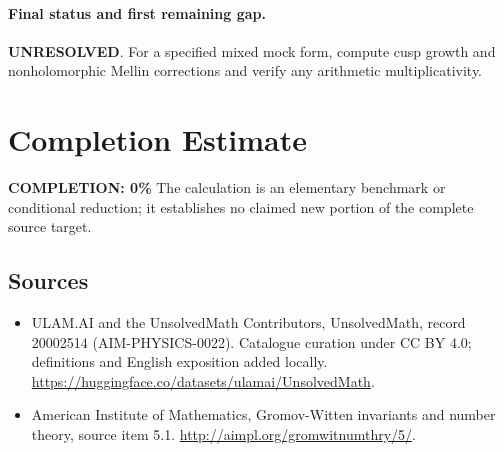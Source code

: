 \documentclass[11pt]{article}
\begin{document}
\paragraph{Final status and first remaining gap.}
\textbf{UNRESOLVED}. For a specified mixed mock form, compute cusp growth and nonholomorphic Mellin corrections and verify any arithmetic multiplicativity.

\section{Completion Estimate}
\noindent\textbf{COMPLETION: 0\%}
The calculation is an elementary benchmark or conditional reduction; it establishes no claimed new portion of the complete source target.

\subsection{Sources}
\begin{itemize}
\item[\hypertarget{source:20002514:1}{S1}] ULAM.AI and the UnsolvedMath Contributors, UnsolvedMath, record 20002514 (AIM-PHYSICS-0022). Catalogue curation under CC BY 4.0; definitions and English exposition added locally.
\url{https://huggingface.co/datasets/ulamai/UnsolvedMath}.
\item[\hypertarget{source:20002514:2}{S2}] American Institute of Mathematics, Gromov-Witten invariants and number theory, source item 5.1.
\url{http://aimpl.org/gromwitnumthry/5/}.
\end{itemize}
\label{end:20002514}
\end{document}
